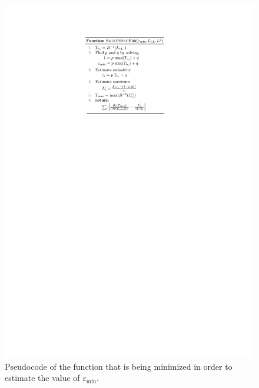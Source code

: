 \begin{figure}[!t]
\centering
\includegraphics[scale=1]{pics/Chapter_03/pseudo_code.pdf}
\vspace{1.5 em}
\caption{Pseudocode of the function that is being minimized in order to estimate the value of $\varepsilon_\mathrm{min}$.}
\label{fig:FunctionCode}
\end{figure}

